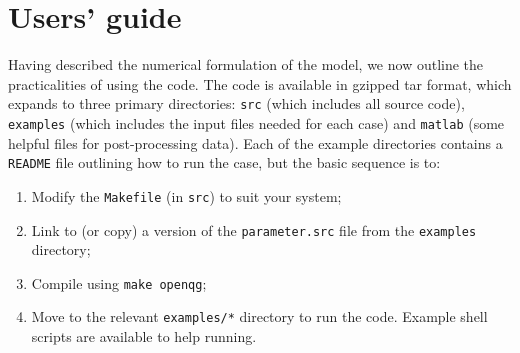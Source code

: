 \documentclass[11pt, a4paper,twoside]{article}
\numberwithin{equation}{section}
\begin{document}
\section{ Users' guide}
Having described the numerical formulation of the model, we now outline the practicalities of using the code.
The code is available in gzipped tar format, which expands to three primary directories: \verb=src= (which includes all source code), \verb=examples= (which includes the input files needed for each case) and \verb=matlab= (some helpful files for post-processing data).
Each of the example directories contains a \verb=README= file outlining how to run the case, but the basic sequence is to:
\begin{enumerate}
\item Modify the \verb=Makefile= (in \verb=src=) to suit your system;
\item Link to (or copy) a version of the \verb=parameter.src= file from the \verb=examples= directory; 
\item Compile using \verb=make openqg=;
\item Move to the relevant \verb=examples/*= directory to run the code. Example shell scripts are available to help running.
\end{enumerate}
\end{document}
